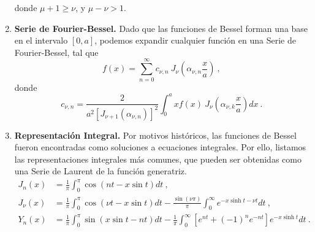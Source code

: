 \begin{propiedad}
\begin{enumerate}
\begin{equation}
        \end{equation}
        donde $\mu + 1 \geq \nu$, y $\mu - \nu > 1$.
        \item \textbf{Serie de Fourier-Bessel.} Dado que las funciones de Bessel forman una base en el intervalo $[0,a]$, podemos expandir cualquier función en una Serie de Fourier-Bessel, tal que
        \begin{equation}
            f(x) = \sum_{n=0}^\infty c_{\nu, n} \ J_\nu\left(\alpha_{\nu, n} \frac{x}{a}\right) \ ,
        \end{equation}
        donde
        \begin{equation}
            c_{\nu, n} = \frac{2}{a^2 \left[J_{\nu+1}(\alpha_{\nu, n})\right]^2} \int_0^a x f(x) \ J_\nu\left( \alpha_{\nu, k} \frac{x}{a} \right) dx \ .
        \end{equation}
        \item \textbf{Representación Integral.} Por motivos históricos, las funciones de Bessel fueron encontradas como soluciones a ecuaciones integrales. Por ello, listamos las representaciones integrales más comunes, que pueden ser obtenidas como una Serie de Laurent de la función generatriz.
        \begin{align}
            J_n(x) & = \frac{1}{\pi}\int_0^\pi \cos(nt - x\sin t) dt \ , \\
            J_\nu(x) & = \frac{1}{\pi} \int_0^\pi \cos(\nu t - x\sin t) dt - \frac{\sin(\nu \pi)}{\pi} \int_0^\infty e^{-x \sinh t - \nu t} dt \ , \\
            Y_n(x) & = \frac{1}{\pi} \int_0^\pi \sin(x\sin t - nt) dt - \frac{1}{\pi} \int_0^\infty \left[e^{nt} + (-1)^n e^{-nt} \right] e^{-x \sinh t} dt \ .
        \end{align}
    

\end{enumerate}
\end{propiedad}
